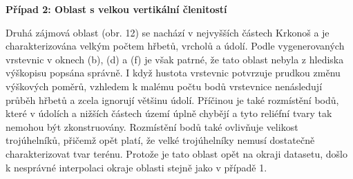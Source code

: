 \par {\large\textbf{Případ 2: Oblast s velkou vertikální členitostí} }
\par Druhá zájmová oblast (obr. 12) se nachází v nejvyšších částech Krkonoš a je charakterizována velkým počtem hřbetů, vrcholů a údolí. Podle vygenerovaných vrstevnic v oknech (b), (d) a (f) je však patrné, že tato oblast nebyla z hlediska výškopisu popsána správně. I když hustota vrstevnic potvrzuje prudkou změnu výškových poměrů, vzhledem k malému počtu bodů vrstevnice nenásledují průběh hřbetů a zcela ignorují většinu údolí. Příčinou je také rozmístění bodů, které v údolích a nižších částech území úplně chybějí a tyto reliéfní tvary tak nemohou být zkonstruovány. Rozmístění bodů také ovlivňuje velikost trojúhelníků, přičemž opět platí, že velké trojúhelníky nemusí dostatečně charakterizovat tvar terénu. Protože je tato oblast opět na okraji datasetu, došlo k nesprávné interpolaci okraje oblasti stejně jako v případě 1.

